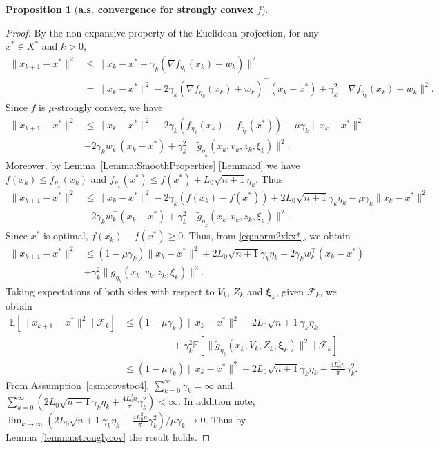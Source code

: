 \documentclass[11pt,reqno]{amsart}
\newcommand{\1}{{\bf 1}}
\newcommand{\2}{{\bf 2}}
\newcommand{\bxi}{\boldsymbol{\xi}}
\numberwithin{equation}{section}
\newtheorem{proposition}{Proposition}[section]
\theoremstyle{remark}
\begin{document}
{\begin{proposition}[{\bf a.s. convergence for strongly convex $f$}]
		\end{proposition}
		\begin{proof}
		By the non-expansive property of the Euclidean projection, for any $x^* \in X^*$ and $k>0$,
		\begin{align*}
			\|x_{k+1}-x^*\|^2 &\leq \|x_k-x^*-\gamma_k \left(\nabla f_{\eta_k}(x_k)+w_k\right)\|^2\\
			&=\|x_k-x^*\|^2-2\gamma_k (\nabla f_{\eta_k}(x_k)+w_k)^{\top}(x_k-x^*)+ \gamma_k^2\|\nabla f_{\eta_k}(x_k)+w_k\|^2.
		\end{align*}
		Since $f$ is $\mu$-strongly convex, we have 
		\begin{align*}
			\|x_{k+1}-x^*\|^2 &\leq  \|x_k-x^*\|^2-2\gamma_k \left(f_{\eta_k}(x_k)-f_{\eta_k}(x^*)\right)-\mu\gamma_k\|x_k-x^*\|^2\\
			&-2\gamma_k w_k^{\top}(x_k-x^*) + \gamma_k^2\|\tilde{g}_{\eta_k}(x_k,v_k,z_k,\xi_k)\|^2.
		\end{align*}
		Moreover, by Lemma~\ref{Lemma:SmoothProperties} \eqref{Lemma:d} we have $f(x_k) \leq f_{\eta_k}(x_k)$ and $f_{\eta_k}(x^*) \leq f(x^*)+L_0\sqrt{n+1}\eta_k$. Thus
		\begin{align}\label{eq:norm2xkx*}
			\|x_{k+1}-x^*\|^2 &\leq  \|x_k-x^*\|^2-2\gamma_k \left(f(x_k)-f(x^*)\right)+2L_0\sqrt{n+1}\gamma_k\eta_k-\mu\gamma_k\|x_k-x^*\|^2\nonumber\\
			&-2\gamma_k w_k^{\top}(x_k-x^*)+ \gamma_k^2\| \tilde{g}_{\eta_k}(x_k,v_k,z_k,\xi_k)\|^2.
		\end{align}
		Since $x^*$ is optimal, $f(x_k)-f(x^*) \geq 0$. Thus, from \eqref{eq:norm2xkx*}, {we obtain} 
		\begin{align*}
			\|x_{k+1}-x^*\|^2 &\leq  (1-\mu \gamma_k)\|x_k-x^*\|^2+2L_0\sqrt{n+1}\gamma_k\eta_k
			-2\gamma_k w_k^{\top}(x_k-x^*)\\
			&+ \gamma_k^2\| {\tilde{g}_{\eta_k}}(x_k,v_k,z_k,\xi_k)\|^2.
		\end{align*}
		Taking expectations of both sides with respect to {${V_k}$, ${Z_k}$ and $\bxi_k$}, given $\mathcal{F}_k$, we obtain
		\begin{align}\label{eq:norm2xkx*cond}
			\mathbb{E}[\|x_{k+1}-x^*\|^2 \mid \mathcal{F}_k] &\leq  (1-\mu\gamma_k)\|x_k-x^*\|^2+2L_0\sqrt{n+1}\gamma_k\eta_k\nonumber\\
			&\quad \quad \quad \quad \quad+ \gamma_k^2\mathbb{E}\left[\| {\tilde{g}_{\eta_k}}(x_k,V_k,Z_k,\bxi_k)\|^2 \mid \mathcal{F}_k\right]\nonumber\\
			&\leq (1-\mu\gamma_k)\|x_k-x^*\|^2+2L_0\sqrt{n+1}\gamma_k\eta_k+ \tfrac{4L_0^2n}{ \pi}\gamma_k^2.
		\end{align}
		From Assumption~\ref{asm:covstoc4}, $\sum_{k=0}^\infty \gamma_k=\infty$ and $\sum_{k=0}^\infty (2L_0\sqrt{n+1}\gamma_k\eta_k+ \frac{4L_0^2n}{ \pi}\gamma_k^2)<\infty$. In addition note,\\
		$\lim _{k \rightarrow \infty}(2L_0\sqrt{n+1}\gamma_k\eta_k+ \frac{4L_0^2n}{ \pi}\gamma_k^2)/\mu\gamma_k \rightarrow 0$. Thus by Lemma~\ref{lemma:stronglycov} the result holds.
		\end{proof}
		
}
\end{document}
